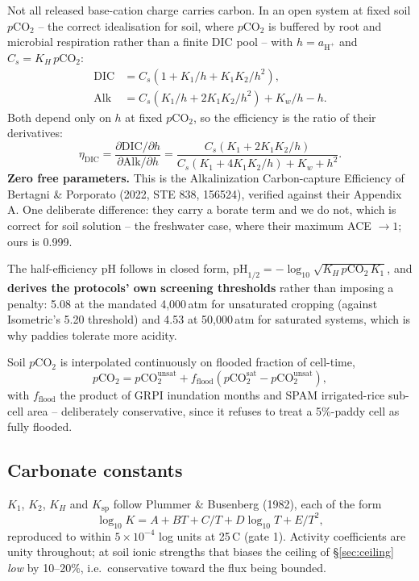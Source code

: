 \documentclass[11pt,a4paper]{article}
\newcommand{\cotwo}{\ensuremath{\mathrm{CO_2}}}
\begin{document}
Not all released base-cation charge carries carbon. In an open system at fixed
soil $p$\cotwo{} -- the correct idealisation for soil, where $p$\cotwo{} is
buffered by root and microbial respiration rather than a finite DIC pool -- with
$h = a_{\mathrm{H^+}}$ and $C_s = K_H\, p\mathrm{CO_2}$:
\begin{align}
\mathrm{DIC} &= C_s\left(1 + K_1/h + K_1K_2/h^2\right), \\
\mathrm{Alk} &= C_s\left(K_1/h + 2K_1K_2/h^2\right) + K_w/h - h .
\end{align}
Both depend only on $h$ at fixed $p$\cotwo{}, so the efficiency is the ratio of
their derivatives:
\begin{equation}
\eta_{\mathrm{DIC}}
= \frac{\partial \mathrm{DIC}/\partial h}{\partial \mathrm{Alk}/\partial h}
= \frac{C_s\left(K_1 + 2K_1K_2/h\right)}
       {C_s\left(K_1 + 4K_1K_2/h\right) + K_w + h^2} .
\end{equation}
\textbf{Zero free parameters.} This is the Alkalinization Carbon-capture
Efficiency of Bertagni \& Porporato (2022, STE 838, 156524), verified against
their Appendix A. One deliberate difference: they carry a borate term and we do
not, which is correct for soil solution -- the freshwater case, where their
maximum ACE $\to 1$; ours is 0.999.

The half-efficiency pH follows in closed form,
$\mathrm{pH}_{1/2} = -\log_{10}\sqrt{K_H\, p\mathrm{CO_2}\, K_1}$, and
\textbf{derives the protocols' own screening thresholds} rather than imposing a
penalty: 5.08 at the mandated
4,000\,\textmu atm for unsaturated cropping (against
Isometric's 5.20 threshold) and 4.53 at
50,000\,\textmu atm for saturated systems, which is why
paddies tolerate more acidity.

Soil $p$\cotwo{} is interpolated continuously on flooded fraction of cell-time,
\begin{equation}
p\mathrm{CO_2} = p\mathrm{CO_2^{unsat}}
 + f_{\mathrm{flood}}\left(p\mathrm{CO_2^{sat}} - p\mathrm{CO_2^{unsat}}\right),
\end{equation}
with $f_{\mathrm{flood}}$ the product of GRPI inundation months and SPAM
irrigated-rice sub-cell area -- deliberately conservative, since it refuses to
treat a 5\%-paddy cell as fully flooded.

\subsection{Carbonate constants}

$K_1$, $K_2$, $K_H$ and $K_{\mathrm{sp}}$ follow Plummer \& Busenberg (1982),
each of the form
\begin{equation}
\log_{10} K = A + BT + C/T + D\log_{10}T + E/T^2 ,
\end{equation}
reproduced to within $5\times10^{-4}$ log units at 25\,\textdegree C (gate 1).
Activity coefficients are unity throughout; at soil ionic strengths that biases
the ceiling of \S\ref{sec:ceiling} \emph{low} by 10--20\%, i.e.\ conservative
toward the flux being bounded.
\end{document}
